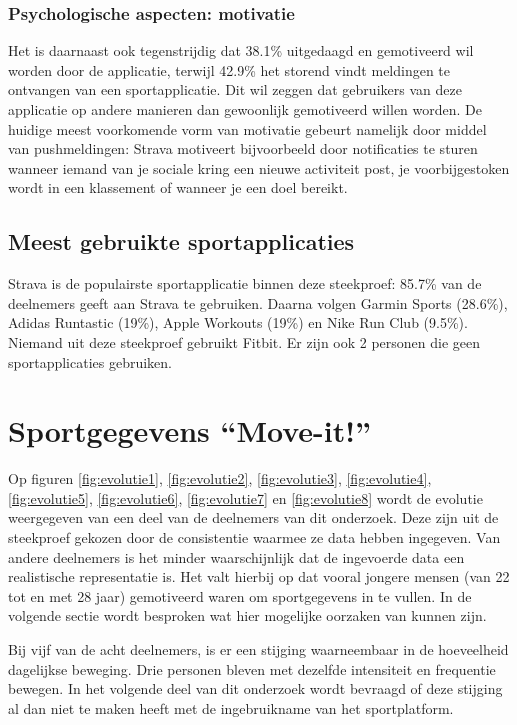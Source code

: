 \subsubsection{Psychologische aspecten: motivatie}

Het is daarnaast ook tegenstrijdig dat 38.1\% uitgedaagd en gemotiveerd wil worden door de applicatie, terwijl 42.9\% het storend vindt meldingen te ontvangen van een sportapplicatie. Dit wil zeggen dat gebruikers van deze applicatie op andere manieren dan gewoonlijk gemotiveerd willen worden.
De huidige meest voorkomende vorm van motivatie gebeurt namelijk door middel van pushmeldingen:
Strava motiveert bijvoorbeeld door notificaties te sturen wanneer iemand van je sociale kring een nieuwe activiteit post, je voorbijgestoken wordt in een klassement of wanneer je een doel bereikt.

\subsection{Meest gebruikte sportapplicaties}

Strava is de populairste sportapplicatie binnen deze steekproef: 85.7\% van de deelnemers geeft aan Strava te gebruiken. Daarna volgen Garmin Sports (28.6\%), Adidas Runtastic (19\%), Apple Workouts (19\%) en Nike Run Club (9.5\%). Niemand uit deze steekproef gebruikt Fitbit. Er zijn ook 2 personen die geen sportapplicaties gebruiken.

\section{Sportgegevens ``Move-it!''}

Op figuren \ref{fig:evolutie1}, \ref{fig:evolutie2}, \ref{fig:evolutie3}, \ref{fig:evolutie4}, \ref{fig:evolutie5}, \ref{fig:evolutie6}, \ref{fig:evolutie7} en \ref{fig:evolutie8} wordt de evolutie weergegeven van een deel van de deelnemers van dit onderzoek. Deze zijn uit de steekproef gekozen door de consistentie waarmee ze data hebben ingegeven. Van andere deelnemers is het minder waarschijnlijk dat de ingevoerde data een realistische representatie is. Het valt hierbij op dat vooral jongere mensen (van 22 tot en met 28 jaar) gemotiveerd waren om sportgegevens in te vullen. In de volgende sectie wordt besproken wat hier mogelijke oorzaken van kunnen zijn.

Bij vijf van de acht deelnemers, is er een stijging waarneembaar in de hoeveelheid dagelijkse beweging. Drie personen bleven met dezelfde intensiteit en frequentie bewegen. In het volgende deel van dit onderzoek wordt bevraagd of deze stijging al dan niet te maken heeft met de ingebruikname van het sportplatform.

